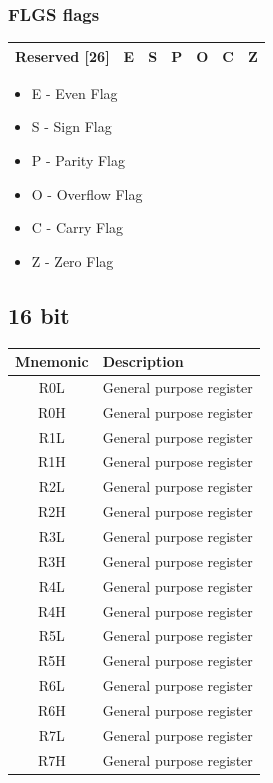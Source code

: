 \subsubsection{FLGS flags}

\begin{tabular}{ | r | r | r | r | r | r | r | }
	\hline
	Reserved [26] & E & S & P & O & C & Z	\\
	\hline
\end{tabular}

\begin{itemize}
	\item E - Even Flag
	\item S - Sign Flag
	\item P - Parity Flag
	\item O - Overflow Flag
	\item C - Carry Flag
	\item Z - Zero Flag
\end{itemize}

\subsection{16 bit}

\begin{tabular}{ | c | l | }
	\hline                        
	\textbf{Mnemonic} & \textbf{Description} \\
	\hline
	R0L & General purpose register \\
	\hline
	R0H & General purpose register \\
	\hline
	R1L & General purpose register \\
	\hline
	R1H & General purpose register \\
	\hline
	R2L & General purpose register \\
	\hline
	R2H & General purpose register \\
	\hline
	R3L & General purpose register \\
	\hline
	R3H & General purpose register \\
	\hline
	R4L & General purpose register \\
	\hline
	R4H & General purpose register \\
	\hline
	R5L & General purpose register \\
	\hline
	R5H & General purpose register \\
	\hline
	R6L & General purpose register \\
	\hline
	R6H & General purpose register \\
	\hline
	R7L & General purpose register \\
	\hline
	R7H & General purpose register \\
	\hline
\end{tabular}

